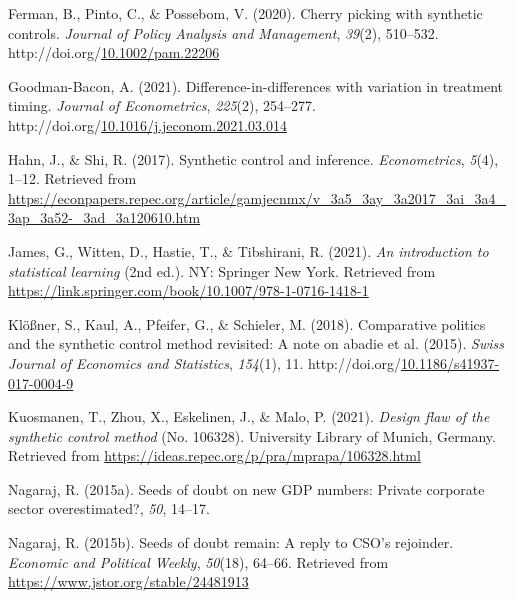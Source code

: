 \documentclass[12pt,nobind, a4paper]{reedthesis}
\newlength{\cslhangindent}
\newenvironment{CSLReferences}[2] %
{%
	\setlength{\parindent}{0pt}
	\ifodd #1 \everypar{\setlength{\hangindent}{\cslhangindent}}\ignorespaces\fi
	\ifnum #2 > 0
	\setlength{\parskip}{#2\baselineskip}
	\fi
}%
{}
\begin{document}
\begin{CSLReferences}{1}{0}
 \leavevmode{}%
 Ferman, B., Pinto, C., \& Possebom, V. (2020). Cherry picking with synthetic controls. \emph{Journal of Policy Analysis and Management}, \emph{39}(2), 510--532. http://doi.org/\href{https://doi.org/10.1002/pam.22206}{10.1002/pam.22206}

 \leavevmode{}%
 Goodman-Bacon, A. (2021). Difference-in-differences with variation in treatment timing. \emph{Journal of Econometrics}, \emph{225}(2), 254--277. http://doi.org/\href{https://doi.org/10.1016/j.jeconom.2021.03.014}{10.1016/j.jeconom.2021.03.014}

 \leavevmode{}%
 Hahn, J., \& Shi, R. (2017). Synthetic control and inference. \emph{Econometrics}, \emph{5}(4), 1--12. Retrieved from \url{https://econpapers.repec.org/article/gamjecnmx/v_3a5_3ay_3a2017_3ai_3a4_3ap_3a52-_3ad_3a120610.htm}

 \leavevmode{}%
 James, G., Witten, D., Hastie, T., \& Tibshirani, R. (2021). \emph{An introduction to statistical learning} (2nd ed.). {NY}: Springer New York. Retrieved from \url{https://link.springer.com/book/10.1007/978-1-0716-1418-1}

 \leavevmode{}%
 Klößner, S., Kaul, A., Pfeifer, G., \& Schieler, M. (2018). Comparative politics and the synthetic control method revisited: A note on abadie et al. (2015). \emph{Swiss Journal of Economics and Statistics}, \emph{154}(1), 11. http://doi.org/\href{https://doi.org/10.1186/s41937-017-0004-9}{10.1186/s41937-017-0004-9}

 \leavevmode{}%
 Kuosmanen, T., Zhou, X., Eskelinen, J., \& Malo, P. (2021). \emph{Design flaw of the synthetic control method} (No. 106328). University Library of Munich, Germany. Retrieved from \url{https://ideas.repec.org/p/pra/mprapa/106328.html}

 \leavevmode{}%
 Nagaraj, R. (2015a). Seeds of doubt on new {GDP} numbers: Private corporate sector overestimated?, \emph{50}, 14--17.

 \leavevmode{}%
 Nagaraj, R. (2015b). Seeds of doubt remain: A reply to {CSO}'s rejoinder. \emph{Economic and Political Weekly}, \emph{50}(18), 64--66. Retrieved from \url{https://www.jstor.org/stable/24481913}


\end{CSLReferences}
\end{document}
